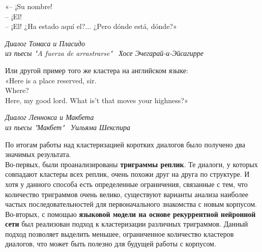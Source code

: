 \documentclass[a4paper,14pt]{article}
\begin{document}
\begin{justify}
\indent
«-- ¡Su nombre! \\
\indent
-- ¡El! \\
\indent
-- ¡El! ¿Ha estado aquí el?... ¿Pero dónde está, dónde?»
\begin{flushright}\textit{Диалог Томаса и Пласидо\\из пьесы "A fuerza de arrastrarse" \ Хосе Эчегарай-и-Эйсагирре}\end{flushright}
Или другой пример того же кластера на английском языке: \\
\indent
«Here is a place reserved, sir.\\
\indent
Where?\\
\indent
Here, my good lord. What is't that moves your highness?»
\begin{flushright}\textit{Диалог Леннокса и Макбета\\из пьесы "Макбет" \ Уильяма Шекспира}\end{flushright}
По итогам работы над кластеризацией коротких диалогов было получено два значимых результата. \\
\indent
Во-первых, были проанализированы \textbf{триграммы реплик}. Те диалоги, у которых совпадают кластеры всех реплик, очень похожи друг на друга по структуре. И хотя у данного способа есть определенные ограничения, связанные с тем, что количество триграммов очень велико, существуют варианты анализа наиболее частых последовательностей для первоначального знакомства с новым корпусом. \\
\indent
Во-вторых, с помощью \textbf{языковой модели на основе рекуррентной нейронной сети} был реализован подход к кластеризации различных триграммов. Данный подход позволяет выделить меньшее, ограниченное количество кластеров диалогов, что может быть полезно для будущей работы с корпусом.

\end{justify}
\pagebreak
\end{document}
